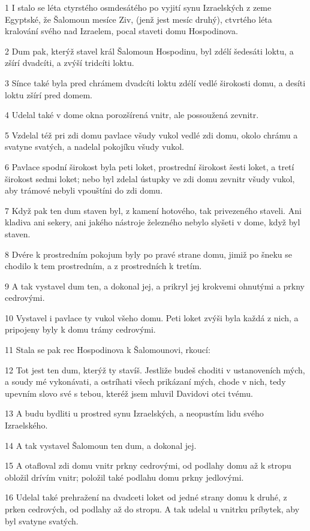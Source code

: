 \par 1 I stalo se léta ctyrstého osmdesátého po vyjití synu Izraelských z zeme Egyptské, že Šalomoun mesíce Ziv, (jenž jest mesíc druhý), ctvrtého léta kralování svého nad Izraelem, pocal staveti domu Hospodinova.
\par 2 Dum pak, kterýž stavel král Šalomoun Hospodinu, byl zdélí šedesáti loktu, a zšírí dvadcíti, a zvýší tridcíti loktu.
\par 3 Sínce také byla pred chrámem dvadcíti loktu zdélí vedlé širokosti domu, a desíti loktu zšírí pred domem.
\par 4 Udelal také v dome okna porozšírená vnitr, ale possoužená zevnitr.
\par 5 Vzdelal též pri zdi domu pavlace všudy vukol vedlé zdi domu, okolo chrámu a svatyne svatých, a nadelal pokojíku všudy vukol.
\par 6 Pavlace spodní širokost byla peti loket, prostrední širokost šesti loket, a tretí širokost sedmi loket; nebo byl zdelal ústupky ve zdi domu zevnitr všudy vukol, aby trámové nebyli vpouštíni do zdi domu.
\par 7 Když pak ten dum staven byl, z kamení hotového, tak privezeného staveli. Ani kladiva ani sekery, ani jakého nástroje železného nebylo slyšeti v dome, když byl staven.
\par 8 Dvére k prostredním pokojum byly po pravé strane domu, jimiž po šneku se chodilo k tem prostredním, a z prostredních k tretím.
\par 9 A tak vystavel dum ten, a dokonal jej, a prikryl jej krokvemi ohnutými a  prkny cedrovými.
\par 10 Vystavel i pavlace ty vukol všeho domu. Peti loket zvýši byla každá z nich, a pripojeny byly k domu trámy cedrovými.
\par 11 Stala se pak rec Hospodinova k Šalomounovi, rkoucí:
\par 12 Tot jest ten dum, kterýž ty stavíš. Jestliže budeš choditi v ustanoveních mých, a soudy mé vykonávati, a ostríhati všech prikázaní mých, chode v nich, tedy upevním slovo své s tebou, kteréž jsem mluvil Davidovi otci tvému.
\par 13 A budu bydliti u prostred synu Izraelských, a neopustím lidu svého Izraelského.
\par 14 A tak vystavel Šalomoun ten dum, a dokonal jej.
\par 15 A otafloval zdi domu vnitr prkny cedrovými, od podlahy domu až k stropu obložil drívím vnitr; položil také podlahu domu prkny jedlovými.
\par 16 Udelal také prehražení na dvadceti loket od jedné strany domu k druhé, z prken cedrových, od podlahy až do stropu. A tak udelal u vnitrku príbytek, aby byl svatyne svatých.
